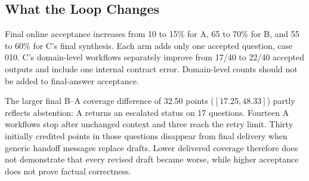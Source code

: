 \subsection{What the Loop Changes}
Final online acceptance increases from 10 to 15\% for A, 65 to 70\% for B, and 55 to 60\% for C's final synthesis. Each arm adds only one accepted question, case 010. C's domain-level workflows separately improve from 17/40 to 22/40 accepted outputs and include one internal contract error. Domain-level counts should not be added to final-answer acceptance.

The larger final B--A coverage difference of 32.50 points ($[17.25,48.33]$) partly reflects abstention: A returns an escalated status on 17 questions. Fourteen A workflows stop after unchanged context and three reach the retry limit. Thirty initially credited points in those questions disappear from final delivery when generic handoff messages replace drafts. Lower delivered coverage therefore does not demonstrate that every revised draft became worse, while higher acceptance does not prove factual correctness.

